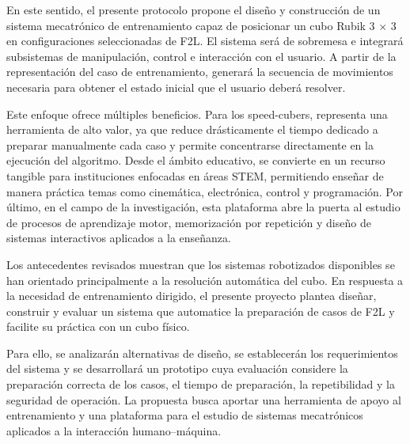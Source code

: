 En este sentido, el presente protocolo propone el diseño y construcción de un sistema mecatrónico de entrenamiento capaz de posicionar un cubo Rubik 3 × 3 en configuraciones seleccionadas de F2L. El sistema será de sobremesa e integrará subsistemas de manipulación, control e interacción con el usuario. A partir de la representación del caso de entrenamiento, generará la secuencia de movimientos necesaria para obtener el estado inicial que el usuario deberá resolver.

Este enfoque ofrece múltiples beneficios. Para los speed-cubers, representa una herramienta de alto valor, ya que reduce drásticamente el tiempo dedicado a preparar manualmente cada caso y permite concentrarse directamente en la ejecución del algoritmo. Desde el ámbito educativo, se convierte en un recurso tangible para instituciones enfocadas en áreas STEM, permitiendo enseñar de manera práctica temas como cinemática, electrónica, control y programación. Por último, en el campo de la investigación, esta plataforma abre la puerta al estudio de procesos de aprendizaje motor, memorización por repetición y diseño de sistemas interactivos aplicados a la enseñanza.

Los antecedentes revisados muestran que los sistemas robotizados disponibles se han orientado principalmente a la resolución automática del cubo. En respuesta a la necesidad de entrenamiento dirigido, el presente proyecto plantea diseñar, construir y evaluar un sistema que automatice la preparación de casos de F2L y facilite su práctica con un cubo físico.

Para ello, se analizarán alternativas de diseño, se establecerán los requerimientos del sistema y se desarrollará un prototipo cuya evaluación considere la preparación correcta de los casos, el tiempo de preparación, la repetibilidad y la seguridad de operación. La propuesta busca aportar una herramienta de apoyo al entrenamiento y una plataforma para el estudio de sistemas mecatrónicos aplicados a la interacción humano--máquina.
